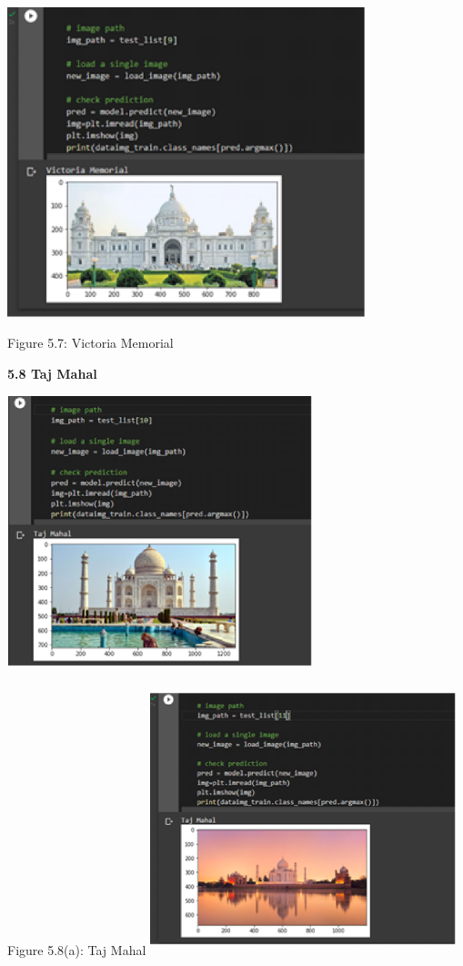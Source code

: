 \documentclass[10pt]{article} %
\begin{document}
\noindent \includegraphics*[width=4.10in, height=3.55in, keepaspectratio=false]{image16}

\noindent Figure 5.7: Victoria Memorial \newline

\newpage
\textbf{5.8 Taj Mahal}

\includegraphics*[width=3.5in, height=3.1in, keepaspectratio=false]{image17}

\noindent Figure 5.8(a): Taj Mahal\newline
\includegraphics*[width=3.5in, height=3.1in, keepaspectratio=false]{image18}
\end{document}
